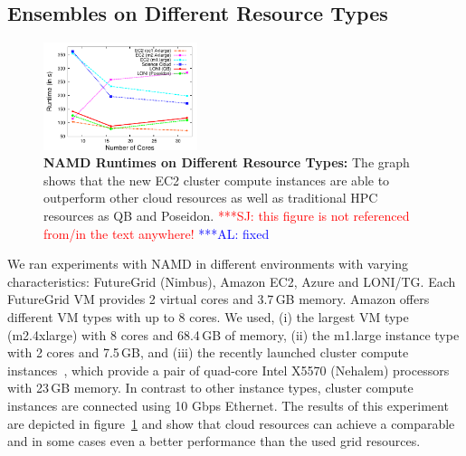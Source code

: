 \documentclass[conference,final]{IEEEtran}
\newcommand{\up}{\vspace*{-1em}}
\newcommand{\alnote}[1]{ {\textcolor{blue} { ***AL: #1 }}}
\newcommand{\jhanote}[1]{ {\textcolor{red} { ***SJ: #1 }}}
\newcommand{\alnote}[1]{}
\newcommand{\jhanote}[1]{}
\begin{document}

\subsection{Ensembles on Different Resource Types}
\up
\label{sec:performance_namd}

\begin{figure}[t]
    \centering
        \includegraphics[width=0.4\textwidth]{performance/namd_run}
    \caption{\textbf{NAMD Runtimes on Different Resource Types: } The
          graph shows that the new EC2 cluster compute instances are 
          able to outperform other cloud resources as well as traditional
          HPC resources as QB and Poseidon. \jhanote{this figure is
            not referenced from/in the text anywhere!} \alnote{fixed} \up}
    \label{fig:performance_namd_run}

\end{figure}


We ran experiments with NAMD in different environments with varying
characteristics: FutureGrid (Nimbus), Amazon EC2, Azure and LONI/TG.
Each FutureGrid VM provides 2 virtual cores and 3.7\,GB memory.
Amazon offers different VM types with up to 8 cores. We used, (i) the
largest VM type (m2.4xlarge) with 8 cores and 68.4\,GB of memory, (ii)
the m1.large instance type with 2 cores and 7.5\,GB, and (iii) the
recently launched cluster compute instances~\cite{ec2-cc}, which
provide a pair of quad-core Intel X5570 (Nehalem) processors with
23\,GB memory. In contrast to other instance types, cluster compute
instances are connected using 10 Gbps Ethernet. The results
of this experiment are depicted in figure~\ref{fig:performance_namd_run}
and show that cloud resources can achieve a comparable and in some cases even
a better performance than the used grid resources.
\end{document}
